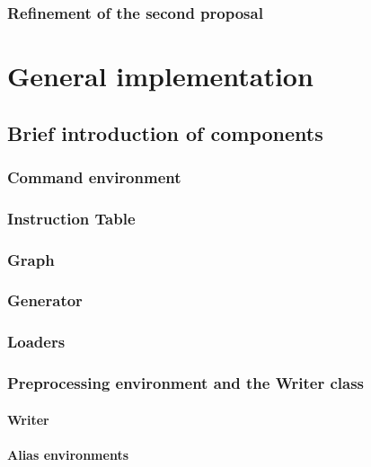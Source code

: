         \subsection{Refinement of the second proposal}

\chapter{General implementation}

    \section{Brief introduction of components}

        \subsection{Command environment}

        \subsection{Instruction Table} 

        \subsection{Graph}

        \subsection{Generator}

        \subsection{Loaders}

        \subsection{Preprocessing environment and the Writer class}

            \subsubsection{Writer}

            \subsubsection{Alias environments}

